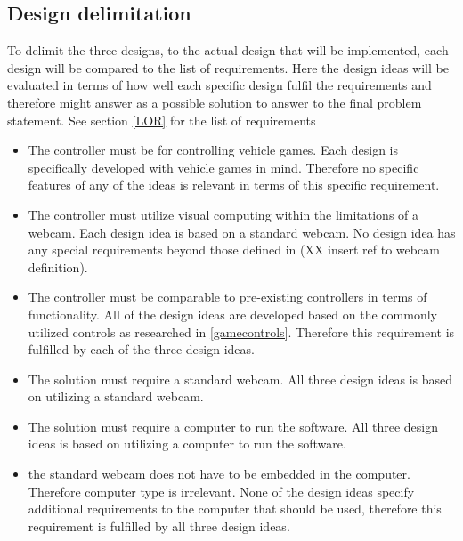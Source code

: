 \subsection{Design delimitation}

To delimit the three designs, to the actual design that will be implemented, each design will be compared to the list of requirements. Here the design ideas will be evaluated in terms of how well each specific design fulfil the requirements and therefore might answer as a possible solution to answer to the final problem statement. See section \ref{LOR} for the list of requirements

\begin{itemize}
\item The controller must be for controlling vehicle games.\newline
Each design is specifically developed with vehicle games in mind. Therefore no specific features of any of the ideas is relevant in terms of this specific requirement.

\item The controller must utilize visual computing within the limitations of a webcam.\newline
Each design idea is based on a standard webcam. No design idea has any special requirements beyond those defined in (XX insert ref to webcam definition). 

\item The controller must be comparable to pre-existing controllers in terms of functionality.\newline
All of the design ideas are developed based on the commonly utilized controls as researched in \ref{gamecontrols}. Therefore this requirement is fulfilled by each of the three design ideas.

\item The solution must require a standard webcam.\newline
All three design ideas is based on utilizing a standard webcam.

\item The solution must require a computer to run the software.\newline
All three design ideas is based on utilizing a computer to run the software.

\item the standard webcam does not have to be embedded in the computer. Therefore computer type is irrelevant.\newline
None of the design ideas specify additional requirements to the computer that should be used, therefore this requirement is fulfilled by all three design ideas.


\end{itemize}
